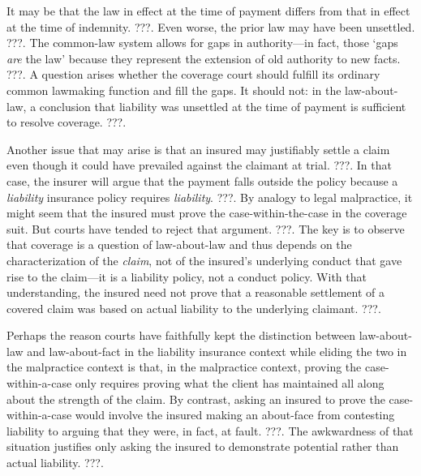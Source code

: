 \documentclass[
  12pt,
  letterpaper,
]{scrartcl}
\begin{document}
It may be that the law in effect at the time of payment differs from that in
effect at the time of indemnity. ???. Even worse, the prior law may have been
unsettled. ???. The common-law system allows for gaps in authority---in fact,
those `gaps \emph{are} the law' because they represent the extension of old
authority to new facts. ???. A question arises whether the coverage court
should fulfill its ordinary common lawmaking function and fill the gaps. It
should not: in the law-about-law, a conclusion that liability was unsettled at
the time of payment is sufficient to resolve coverage. ???.

Another issue that may arise is that an insured may justifiably settle a claim
even though it could have prevailed against the claimant at trial. ???. In that
case, the insurer will argue that the payment falls outside the policy
because a \emph{liability} insurance policy requires \emph{liability}. ???. By
analogy to legal malpractice, it might seem that the insured must prove the
case-within-the-case in the coverage suit. But courts have tended to reject
that argument. ???. The key is to observe that coverage is a question of
law-about-law and thus depends on the characterization of the \emph{claim}, not
of the insured's underlying conduct that gave rise to the claim---it is
a liability policy, not a conduct policy. With that understanding, the insured need not
prove that a reasonable settlement of a covered claim was based on actual
liability to the underlying claimant. ???.

Perhaps the reason courts have faithfully kept the distinction between
law-about-law and law-about-fact in the liability insurance context while
eliding the two in the malpractice context is
that, in the malpractice context, proving the case-within-a-case only requires
proving what the client has maintained all along about the strength of the
claim. By contrast, asking an insured to prove the case-within-a-case would
involve the insured making an about-face from contesting liability to arguing
that they were, in fact, at fault. ???. The awkwardness of that situation
justifies only asking the insured to demonstrate 
potential rather than actual liability. ???.
\end{document}
